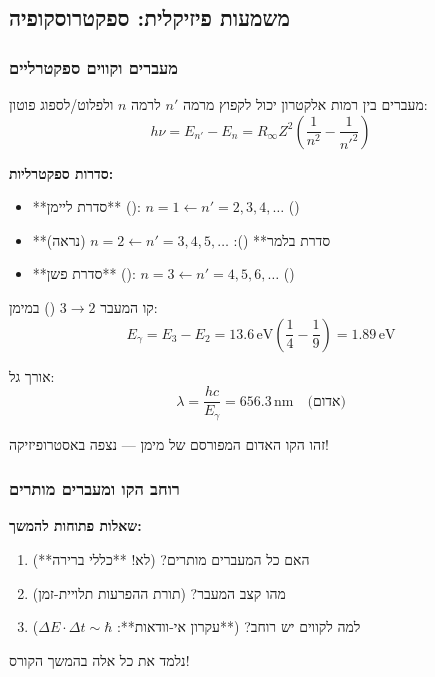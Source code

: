 \subsection{משמעות פיזיקלית: ספקטרוסקופיה}

\subsubsection{מעברים וקווים ספקטרליים}

\begin{importantbox}{מעברים בין רמות}
אלקטרון יכול לקפוץ מרמה $n'$ לרמה $n$ ולפלוט/לספוג פוטון:
\[
h\nu = E_{n'} - E_n = R_\infty Z^2\left(\frac{1}{n^2} - \frac{1}{n'^2}\right)
\]

\textbf{סדרות ספקטרליות:}
\begin{itemize}
    \item **סדרת ליימן** (): $n=1 \leftarrow n'=2,3,4,\ldots$ ()
    \item **סדרת בלמר** (): $n=2 \leftarrow n'=3,4,5,\ldots$ (נראה)
    \item **סדרת פשן** (): $n=3 \leftarrow n'=4,5,6,\ldots$ ()
\end{itemize}
\end{importantbox}

\begin{examplebox}{קו }
המעבר $3 \to 2$ () במימן:
\[
E_\gamma = E_3 - E_2 = 13.6 \, \text{eV} \left(\frac{1}{4} - \frac{1}{9}\right) = 1.89 \, \text{eV}
\]

אורך גל:
\[
\lambda = \frac{hc}{E_\gamma} = 656.3 \, \text{nm} \quad \text{(אדום)}
\]

זהו הקו האדום המפורסם של מימן — נצפה באסטרופיזיקה!
\end{examplebox}

\subsubsection{רוחב הקו ומעברים מותרים}

\begin{notebox}
\textbf{שאלות פתוחות להמשך:}
\begin{enumerate}
    \item האם כל המעברים מותרים? (לא! **כללי ברירה**)
    \item מהו קצב המעבר? (תורת ההפרעות תלויית-זמן)
    \item למה לקווים יש רוחב? (**עקרון אי-וודאות**: $\Delta E \cdot \Delta t \sim \hbar$)
\end{enumerate}

נלמד את כל אלה בהמשך הקורס!
\end{notebox}

